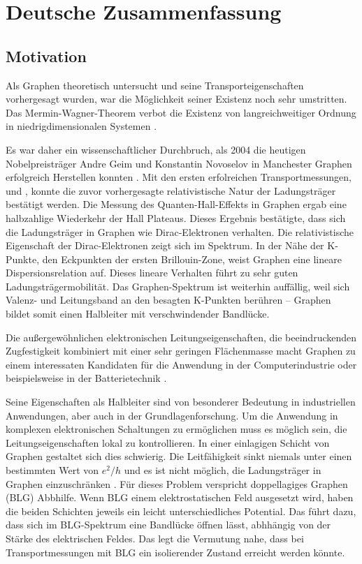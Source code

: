 \section*{Deutsche Zusammenfassung}
\subsection*{Motivation}

Als Graphen theoretisch untersucht und seine Transporteigenschaften vorhergesagt wurden, war die M\"oglichkeit seiner Existenz noch sehr umstritten. Das Mermin-Wagner-Theorem verbot die Existenz von langreichweitiger Ordnung in niedrigdimensionalen Systemen \cite{Mermin1966}.

Es war daher ein wissenschaftlicher Durchbruch, als 2004 die heutigen Nobelpreistr\"ager Andre Geim und Konstantin Novoselov in Manchester Graphen erfolgreich Herstellen konnten \cite{Novoselov2004}. Mit den ersten erfolreichen Transportmessungen, \cite{Zhang2005} und \cite{Novoselov2005}, konnte die zuvor vorhergesagte relativistische Natur der Ladungstr\"ager \cite{Semenoff1984} best\"atigt werden. Die Messung des Quanten-Hall-Effekts in Graphen ergab eine halbzahlige Wiederkehr der Hall Plateaus. Dieses Ergebnis best\"atigte, dass sich die Ladungstr\"ager in Graphen wie Dirac-Elektronen verhalten.
Die relativistische Eigenschaft der Dirac-Elektronen zeigt sich im Spektrum. In der N\"ahe der K-Punkte, den Eckpunkten der ersten Brillouin-Zone, weist Graphen eine lineare Dispersionsrelation auf. Dieses lineare Verhalten f\"uhrt zu sehr guten Ladungstr\"agermobilit\"at. Das Graphen-Spektrum ist weiterhin auff\"allig, weil sich Valenz- und Leitungsband an den besagten K-Punkten ber\"uhren -- Graphen bildet somit einen Halbleiter mit verschwindender Bandl\"ucke. 

Die au{\ss}ergew\"ohnlichen elektronischen Leitungseigenschaften, die beeindruckenden Zugfestigkeit kombiniert mit einer sehr geringen Fl\"achenmasse macht Graphen zu einem interessaten Kandidaten f\"ur die Anwendung in der Computerindustrie \cite{Jurewicz2014} oder beispielsweise in der Batterietechnik \cite{Son2017}.

Seine Eigenschaften als Halbleiter sind von besonderer Bedeutung in industriellen Anwendungen, aber auch in der Grundlagenforschung. Um die Anwendung in komplexen elektronischen Schaltungen zu erm\"oglichen muss es m\"oglich sein, die Leitungseigenschaften lokal zu kontrollieren. In einer einlagigen Schicht von Graphen gestaltet sich dies schwierig. Die Leitf\"ahigkeit sinkt niemals unter einen bestimmten Wert von $e^2/h$ und es ist nicht m\"oglich, die Ladungstr\"ager in Graphen einzuschr\"anken \cite{Katsnelson2006}. F\"ur dieses Problem verspricht doppellagiges Graphen (BLG) Abbhilfe. Wenn BLG einem elektrostatischen Feld ausgesetzt wird, haben die beiden Schichten jeweils ein leicht unterschiedliches Potential. Das f\"uhrt dazu, dass sich im BLG-Spektrum eine Bandl\"ucke \"offnen l\"asst, abhh\"angig von der St\"arke des elektrischen Feldes. Das legt die Vermutung nahe, dass bei Transportmessungen mit BLG ein isolierender Zustand erreicht werden k\"onnte.

